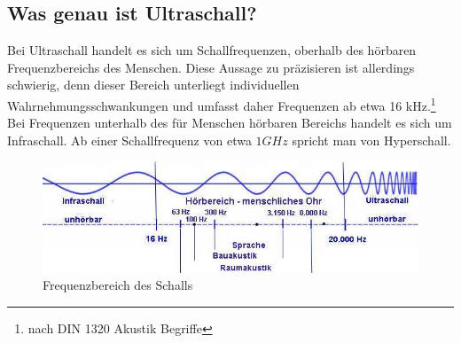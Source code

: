 \subsection{Was genau ist Ultraschall?}
Bei Ultraschall handelt es sich um Schallfrequenzen, oberhalb des hörbaren Frequenzbereichs des Menschen. Diese Aussage zu präzisieren ist allerdings schwierig, denn dieser Bereich unterliegt individuellen Wahrnehmungsschwankungen und umfasst daher Frequenzen ab etwa 16 kHz.\footnote{nach DIN 1320 Akustik Begriffe} Bei Frequenzen unterhalb des für Menschen hörbaren Bereichs handelt es sich um Infraschall. Ab einer Schallfrequenz von etwa $1GHz$ spricht man von Hyperschall. 
\begin{figure}[H]
	\centering
	\includegraphics[scale=0.9]{images/hoerbarer_Schall-Infraschall-Ultraschall.jpg}
	\caption{Frequenzbereich des Schalls\footnotemark}
\end{figure}


